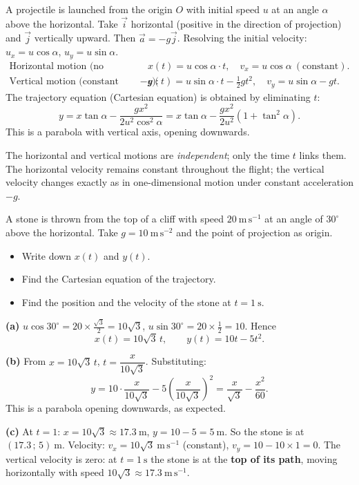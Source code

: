 \documentclass[11pt]{article}
\newcommand{\cle}[1]{{\popxbold\color{popdark}#1}}
\begin{document}
\begin{propriete}
A projectile is launched from the origin $O$ with initial speed $u$ at an angle $\alpha$ above the horizontal. Take $\vec{i}$ horizontal (positive in the direction of projection) and $\vec{j}$ vertically upward. Then $\vec{a}=-g\vec{j}$.
Resolving the initial velocity: $u_x=u\cos\alpha$, $u_y=u\sin\alpha$.
\begin{align*}
\text{Horizontal motion (no acceleration):}\quad & x(t)=u\cos\alpha\cdot t, \quad v_x=u\cos\alpha \ (\text{constant}).\\
\text{Vertical motion (constant acceleration $-g$):}\quad & y(t)=u\sin\alpha\cdot t-\tfrac12 gt^2, \quad v_y=u\sin\alpha-gt.
\end{align*}
The \cle{trajectory equation} (Cartesian equation) is obtained by eliminating $t$:
\[
y=x\tan\alpha-\frac{gx^2}{2u^2\cos^2\alpha}=x\tan\alpha-\frac{gx^2}{2u^2}\left(1+\tan^2\alpha\right).
\]
This is a parabola with vertical axis, opening downwards.
\end{propriete}

\begin{aretenir}
The horizontal and vertical motions are \emph{independent}; only the time $t$ links them. The horizontal velocity remains constant throughout the flight; the vertical velocity changes exactly as in one-dimensional motion under constant acceleration $-g$.
\end{aretenir}

\begin{exoresolu}
A stone is thrown from the top of a cliff with speed $20\ \mathrm{m\,s^{-1}}$ at an angle of $30^{\circ}$ above the horizontal. Take $g=10\ \mathrm{m\,s^{-2}}$ and the point of projection as origin.
\begin{itemize}
\item[(a)] Write down $x(t)$ and $y(t)$.
\item[(b)] Find the Cartesian equation of the trajectory.
\item[(c)] Find the position and the velocity of the stone at $t=1\ \mathrm{s}$.
\end{itemize}
\tcblower
\textbf{(a)} $u\cos30^{\circ}=20\times\frac{\sqrt3}{2}=10\sqrt3$, $u\sin30^{\circ}=20\times\frac12=10$. Hence
\[
x(t)=10\sqrt3\,t,\qquad y(t)=10t-5t^2.
\]

\textbf{(b)} From $x=10\sqrt3\,t$, $t=\dfrac{x}{10\sqrt3}$. Substituting:
\[
y=10\cdot\frac{x}{10\sqrt3}-5\left(\frac{x}{10\sqrt3}\right)^2=\frac{x}{\sqrt3}-\frac{x^2}{60}.
\]
This is a parabola opening downwards, as expected.

\textbf{(c)} At $t=1$: $x=10\sqrt3\approx 17.3\ \mathrm{m}$, $y=10-5=5\ \mathrm{m}$. So the stone is at $(17.3\,;\,5)\ \mathrm{m}$.
Velocity: $v_x=10\sqrt3\ \mathrm{m\,s^{-1}}$ (constant), $v_y=10-10\times1=0$. The vertical velocity is zero: at $t=1\ \mathrm{s}$ the stone is at the \textbf{top of its path}, moving horizontally with speed $10\sqrt3\approx 17.3\ \mathrm{m\,s^{-1}}$.
\end{exoresolu}
\end{document}
